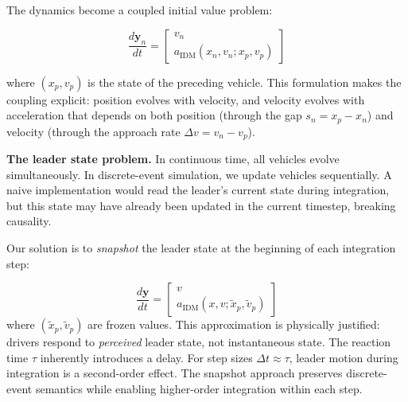 \documentclass{scspaperproc}
\theoremstyle{scsthe}
\begin{document}
    The dynamics become a coupled initial value problem:





    \begin{equation}
        \frac{d\mathbf{y}_n}{dt} = \begin{bmatrix} v_n \\ a_{\text{IDM}}(x_n, v_n; x_p, v_p) \end{bmatrix}
    \end{equation}

    where $(x_p, v_p)$ is the state of the preceding vehicle. This formulation makes the coupling explicit: position evolves with velocity, and velocity evolves with acceleration that depends on both position (through the gap $s_n = x_p - x_n$) and velocity (through the approach rate $\Delta v = v_n - v_p$).


    \textbf{The leader state problem.} In continuous time, all vehicles evolve simultaneously. In discrete-event simulation, we update vehicles sequentially. A naive implementation would read the leader's current state during integration, but this state may have already been updated in the current timestep, breaking causality.

    Our solution is to \textit{snapshot} the leader state at the beginning of each integration step:

    \begin{equation}
        \frac{d\mathbf{y}}{dt} = \begin{bmatrix} v \\ a_{\text{IDM}}(x, v; \tilde{x}_p, \tilde{v}_p) \end{bmatrix}
    \end{equation}
    where $(\tilde{x}_p, \tilde{v}_p)$ are frozen values. This approximation is physically justified: drivers respond to \textit{perceived} leader state, not instantaneous state. The reaction time $\tau$ inherently introduces a delay. For step sizes $\Delta t \approx \tau$, leader motion during integration is a second-order effect. The snapshot approach preserves discrete-event semantics while enabling higher-order integration within each step.
\end{document}
